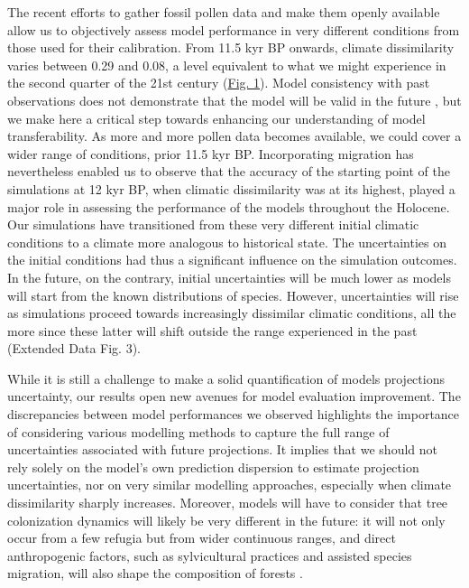 \documentclass[pdflatex, sn-nature]{sn-jnl}%
\begin{document}
The recent efforts to gather fossil pollen data and make them openly available \cite{Williams2018} allow us to objectively assess model performance in very different conditions from those used for their calibration. From 11.5 kyr BP onwards, climate dissimilarity varies between 0.29 and 0.08, a level equivalent to what we might experience in the second quarter of the 21st century (\hyperref[climatic_dissimilarity]{Fig. 1}). Model consistency with past observations does not demonstrate that the model will be valid in the future \cite{Oreskes1994}, but we make here a critical step towards enhancing our understanding of model transferability. As more and more pollen data becomes available, we could cover a wider range of conditions, prior 11.5 kyr BP. Incorporating migration has nevertheless enabled us to observe that the accuracy of the starting point of the simulations at 12 kyr BP, when climatic dissimilarity was at its highest, played a major role in assessing the performance of the models throughout the Holocene. Our simulations have transitioned from these very different initial climatic conditions to a climate more analogous to historical state. The uncertainties on the initial conditions had thus a significant influence on the simulation outcomes. In the future, on the contrary, initial uncertainties will be much lower as models will start from the known distributions of species. However, uncertainties will rise as simulations proceed towards increasingly dissimilar climatic conditions, all the more since these latter will shift outside the range experienced in the past (Extended Data Fig. 3).

While it is still a challenge to make a solid quantification of models projections uncertainty, our results open new avenues for model evaluation improvement. The discrepancies between model performances we observed highlights the importance of considering various modelling methods to capture the full range of uncertainties associated with future projections. It implies that we should not rely solely on the model's own prediction dispersion to estimate projection uncertainties, nor on very similar modelling approaches, especially when climate dissimilarity sharply increases. Moreover, models will have to consider that tree colonization dynamics will likely be very different in the future: it will not only occur from a few refugia but from wider continuous ranges, and direct anthropogenic factors, such as sylvicultural practices and assisted species migration, will also shape the composition of forests \cite{Aitken2016}.
\end{document}
